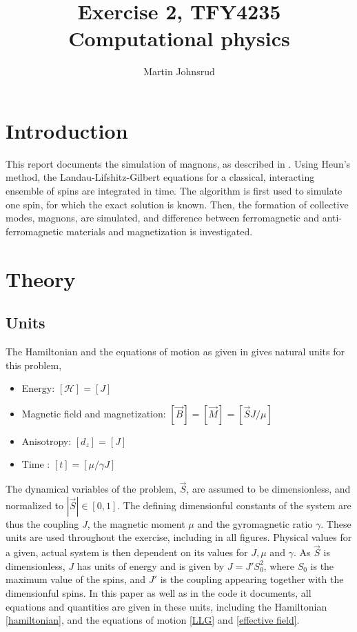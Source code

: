 \documentclass{article}
\title{Exercise 2, TFY4235 Computational physics}
\author{Martin Johnsrud}
\date{}
\begin{document}
    \maketitle
    \section*{Introduction}
    This report documents the simulation of magnons, as described in \cite{exercise}.
    Using Heun's method, the Landau-Lifshitz-Gilbert equations for a classical, interacting ensemble of spins are integrated in time.
    The algorithm is first used to simulate one spin, for which the exact solution is known.
    Then, the formation of collective modes, magnons, are simulated, and difference between ferromagnetic and anti-ferromagnetic materials and magnetization is investigated.

    \section*{Theory}
    \subsection*{Units}

    The Hamiltonian and the equations of motion as given in \cite{exercise} gives natural units for this problem,
    \begin{itemize}
        \item Energy: $[\mathcal H] = [J]$
        \item Magnetic field and magnetization: $[\vec B] = [\vec M] = [\vec S J/\mu ]$
        \item Anisotropy: $[d_z] = [J]$
        \item Time : $[t] = [\mu/\gamma J]$
    \end{itemize}
    The dynamical variables of the problem, $ \vec S $, are assumed to be dimensionless, and normalized to $|\vec S|\in[0, 1]$.
     The defining dimensionful constants of the system are thus the coupling $J$, the magnetic moment $\mu$ and the gyromagnetic ratio $\gamma$.
     These units are used throughout the exercise, including in all figures.
     Physical values for a given, actual system is then dependent on its values for $J, \mu$ and $\gamma$.
     As $\vec S$ is dimensionless, $J$ has units of energy and is given by $J = J' S_0^2$, where $S_0$ is the maximum value of the spins, and $J'$ is the coupling appearing together with the dimensionful spins.
     In this paper as well as in the code it documents, all equations and quantities are given in these units, including the Hamiltonian \autoref{hamiltonian}, and the equations of motion \autoref{LLG} and \autoref{effective field}.
\end{document}
